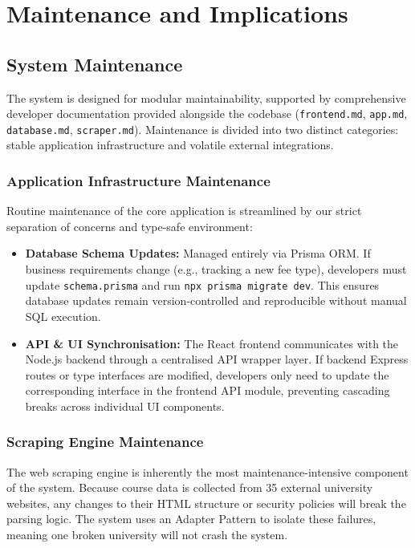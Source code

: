\section{Maintenance and Implications}

\subsection{System Maintenance}
The system is designed for modular maintainability, supported by comprehensive developer documentation provided alongside the codebase (\texttt{frontend.md}, \texttt{app.md}, \texttt{database.md}, \texttt{scraper.md}). Maintenance is divided into two distinct categories: stable application infrastructure and volatile external integrations.

\subsubsection{Application Infrastructure Maintenance}
Routine maintenance of the core application is streamlined by our strict separation of concerns and type-safe environment:
\begin{itemize}
    \item \textbf{Database Schema Updates:} Managed entirely via Prisma ORM. If business requirements change (e.g., tracking a new fee type), developers must update \texttt{schema.prisma} and run \texttt{npx prisma migrate dev}. This ensures database updates remain version-controlled and reproducible without manual SQL execution.
    \item \textbf{API \& UI Synchronisation:} The React frontend communicates with the Node.js backend through a centralised API wrapper layer. If backend Express routes or type interfaces are modified, developers only need to update the corresponding interface in the frontend API module, preventing cascading breaks across individual UI components.
\end{itemize}

\subsubsection{Scraping Engine Maintenance}
The web scraping engine is inherently the most maintenance-intensive component of the system. Because course data is collected from 35 external university websites, any changes to their HTML structure or security policies will break the parsing logic. The system uses an Adapter Pattern to isolate these failures, meaning one broken university will not crash the system. 

